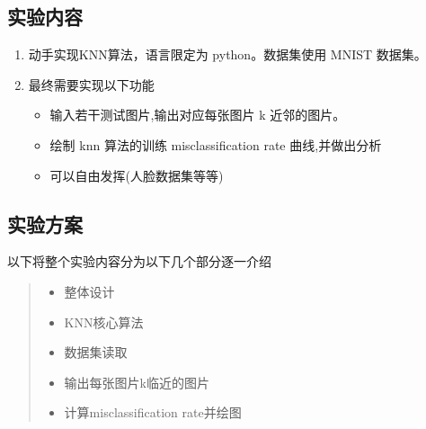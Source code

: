 \documentclass[UTF8]{ctexart}
\begin{document}

\subsection{实验内容}
\begin{enumerate}
    \item 动手实现KNN算法，语言限定为 python。数据集使用 MNIST 数据集。
    \item 最终需要实现以下功能
    \begin{itemize}
        \item 输入若干测试图片,输出对应每张图片 k 近邻的图片。
        \item 绘制 knn 算法的训练 misclassification rate 曲线,并做出分析
        \item 可以自由发挥(人脸数据集等等)
    \end{itemize}
\end{enumerate}

\newpage
\subsection{实验方案}
以下将整个实验内容分为以下几个部分逐一介绍
\begin{quote}
    \begin{itemize}
        \item 整体设计
        \item KNN核心算法
        \item 数据集读取
        \item 输出每张图片k临近的图片
        \item 计算misclassification rate并绘图
    \end{itemize}
\end{quote}
\end{document}
